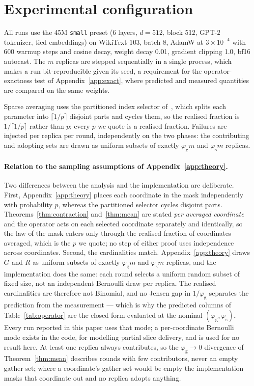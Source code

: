 \documentclass{article}
\theoremstyle{plain}
\newcommand{\pg}{\varphi_{\mathrm{g}}}
\newcommand{\ps}{\varphi_{\mathrm{s}}}
\begin{document}
\section{Experimental configuration}\label{app:setup}

All runs use the 45M \texttt{small} preset (6 layers, $d{=}512$, block 512,
GPT-2 tokenizer, tied embeddings) on WikiText-103, batch 8, AdamW at
$3\times10^{-4}$ with 600 warmup steps and cosine decay, weight decay 0.01,
gradient clipping 1.0, bf16 autocast. The $m$ replicas are stepped sequentially
in a single process, which makes a run bit-reproducible given its seed, a
requirement for the operator-exactness test of Appendix~\ref{app:exact}, where
predicted and measured quantities are compared on the same weights.

Sparse averaging uses the partitioned index selector of~\citet{beton2025sparta},
which splits each parameter into $\lceil 1/p \rceil$ disjoint parts and cycles
them, so the realised fraction is $1/\lceil 1/p\rceil$ rather than $p$; every
$p$ we quote is a realised fraction. Failures are injected per replica per
round, independently on the two phases: the contributing and adopting sets
are drawn as uniform subsets of exactly $\pg m$ and $\ps m$ replicas.

\paragraph{Relation to the sampling assumptions of Appendix~\ref{app:theory}.}
Two differences between the analysis and the implementation are deliberate.
First, Appendix~\ref{app:theory} places each coordinate in the mask
independently with probability $p$, whereas the partitioned selector cycles
disjoint parts. Theorems~\ref{thm:contraction} and~\ref{thm:mean} are stated
\emph{per averaged coordinate} and the operator acts on each selected coordinate
separately and identically, so the law of the mask enters only through the
realised fraction of coordinates averaged, which is the $p$ we quote; no step of
either proof uses independence across coordinates. Second, the cardinalities match. Appendix~\ref{app:theory} draws $G$ and $R$ as
uniform subsets of exactly $\pg m$ and $\ps m$ replicas, and the implementation
does the same: each round selects a uniform random subset of fixed size, not an
independent Bernoulli draw per replica. The realised cardinalities are therefore
not Binomial, and no Jensen gap in $1/\pg$ separates the prediction from the
measurement --- which is why the predicted columns of
Table~\ref{tab:operator} are the closed form evaluated at the nominal
$(\pg,\ps)$. Every run reported in this paper uses that mode; a per-coordinate
Bernoulli mode exists in the code, for modelling partial slice delivery, and is
used for no result here. At least one replica always contributes, so the
$\pg \to 0$ divergence of Theorem~\ref{thm:mean} describes rounds with few
contributors, never an empty gather set; where a coordinate's gather set would
be empty the implementation masks that coordinate out and no replica adopts
anything.
\end{document}
